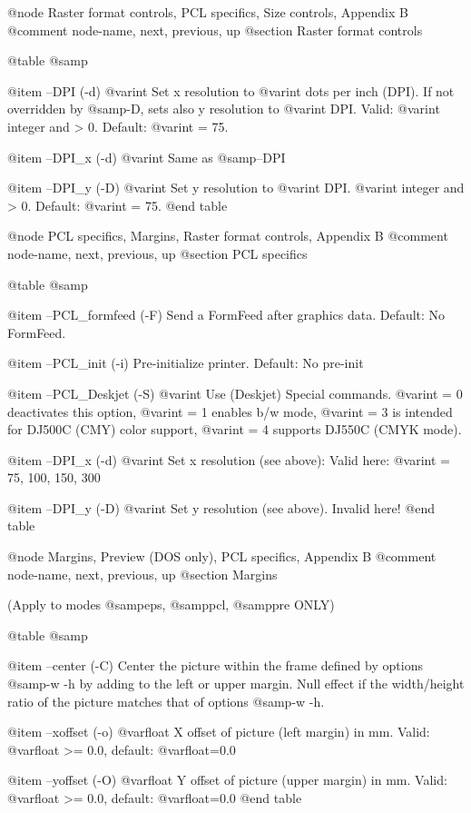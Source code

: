 @node Raster format controls, PCL specifics, Size controls, Appendix B
@comment  node-name,  next,  previous,  up
@section  Raster format controls

@table @samp

@item --DPI (-d) @var{int}
Set x resolution to @var{int} dots per inch (DPI). If not overridden
by @samp{-D}, sets also y resolution to @var{int} DPI.
Valid: @var{int} integer and > 0. Default: @var{int} = 75.

@item --DPI_x (-d) @var{int}
Same as @samp{--DPI}

@item --DPI_y (-D) @var{int}
Set y resolution to @var{int} DPI. @var{int} integer and > 0.
Default: @var{int} = 75.
@end table



@node PCL specifics, Margins, Raster format controls, Appendix B
@comment  node-name,  next,  previous,  up
@section  PCL specifics

@table @samp

@item --PCL_formfeed (-F)
Send a FormFeed after graphics data. Default: No FormFeed.

@item --PCL_init (-i)
Pre-initialize printer. Default: No pre-init

@item --PCL_Deskjet (-S) @var{int}
Use (Deskjet) Special commands. @var{int} = 0 deactivates this option,
@var{int} = 1 enables b/w mode, @var{int} = 3 is intended for DJ500C
(CMY) color support, @var{int} = 4 supports DJ550C (CMYK mode).

@item --DPI_x (-d) @var{int}
Set x resolution (see above): Valid here: @var{int} = 75, 100, 150, 300

@item --DPI_y (-D) @var{int}
Set y resolution (see above). Invalid here!
@end table



@node Margins, Preview (DOS only), PCL specifics, Appendix B
@comment  node-name,  next,  previous,  up
@section  Margins

(Apply to modes @samp{eps}, @samp{pcl}, @samp{pre} ONLY)

@table @samp

@item --center (-C)
Center the picture within the frame defined by options @samp{-w -h} by
adding to the left or upper margin. Null effect if the width/height
ratio of the picture matches that of options @samp{-w -h}.

@item --xoffset (-o) @var{float}
X offset of picture (left  margin) in mm.
Valid: @var{float} >= 0.0, default: @var{float}=0.0

@item --yoffset (-O) @var{float}
Y offset of picture (upper  margin) in mm.
Valid: @var{float} >= 0.0, default: @var{float}=0.0
@end table



